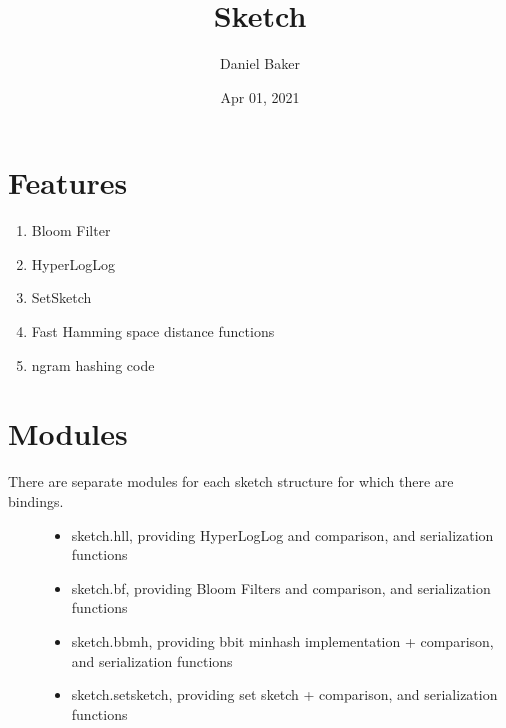 \documentclass[letterpaper,10pt,english]{sphinxmanual}
\title{Sketch}
\date{Apr 01, 2021}
\author{Daniel Baker}
\begin{document}
\pagestyle{empty}
\sphinxmaketitle
\pagestyle{plain}
\sphinxtableofcontents
\pagestyle{normal}
\label{\detokenize{index::doc}}



\chapter{Features}
\label{\detokenize{index:features}}\begin{enumerate}
%
\item {} 
\sphinxAtStartPar
Bloom Filter

\item {} 
\sphinxAtStartPar
HyperLogLog

\item {} 
\sphinxAtStartPar
SetSketch

\item {} 
\sphinxAtStartPar
Fast Hamming space distance functions

\item {} 
\sphinxAtStartPar
ngram hashing code

\end{enumerate}


\chapter{Modules}
\label{\detokenize{index:modules}}\begin{description}
\item[{There are separate modules for each sketch structure for which there are bindings.}] \leavevmode\begin{itemize}
\item {} 
\sphinxAtStartPar
sketch.hll, providing HyperLogLog and comparison, and serialization functions

\item {} 
\sphinxAtStartPar
sketch.bf, providing Bloom Filters and comparison, and serialization functions

\item {} 
\sphinxAtStartPar
sketch.bbmh, providing b\sphinxhyphen{}bit minhash implementation + comparison, and serialization functions

\item {} 
\sphinxAtStartPar
sketch.setsketch, providing set sketch + comparison, and serialization functions

\end{itemize}

\end{description}
\end{document}
